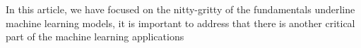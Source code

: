 In this article, we have focused on the nitty-gritty of the fundamentals underline machine learning models, it is important to address that there is another critical part of the  machine learning applications 